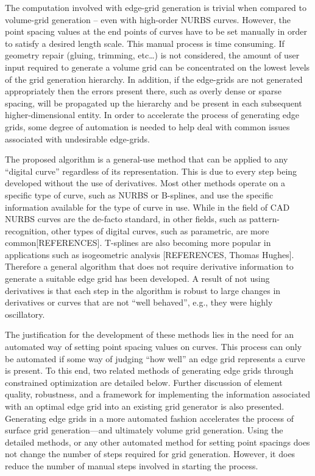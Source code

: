 The computation involved with edge-grid generation is trivial when 
compared to volume-grid generation -- even with high-order NURBS curves. 
However, the point spacing values at the end points of curves have to be set manually in order to satisfy a desired length scale. This manual process is time consuming. If geometry repair (gluing, trimming, etc…) is not considered, the amount of user input required to generate a volume grid can be concentrated on the lowest levels of the grid generation hierarchy. In addition, if the edge-grids are not generated appropriately then the errors present there, such as overly dense or sparse spacing, will be propagated up the hierarchy and be present in each subsequent higher-dimensional entity. In order to accelerate the process of generating edge grids, some degree of automation is needed to help deal with common issues associated with undesirable edge-grids.

The proposed algorithm is a general-use method that can be applied to any 
``digital curve'' regardless of its representation. This is due to every 
step being developed without the use of derivatives. Most other methods 
operate on a specific type of curve, such as NURBS or B-splines, and use 
the specific information available for the type of curve in use. While in 
the field of CAD NURBS curves are the de-facto standard, in other fields, 
such as pattern-recognition, other types of digital curves, such as 
parametric, are more common[REFERENCES]. T-splines are also becoming more 
popular in applications such as isogeometric analysis [REFERENCES, Thomas 
Hughes]. Therefore a general algorithm that does not require derivative 
information to generate a suitable edge grid has been developed. A result 
of not using derivatives is that each step in the algorithm is robust to 
large changes in derivatives or curves that are not ``well behaved'', 
e.g., they were highly oscillatory.

The justification for the development of these methods lies in the need for an automated way of setting point spacing values on curves. This process can only be automated if some way of judging ``how well'' an edge grid represents a curve is present. To this end, two related methods of generating edge grids through constrained optimization are detailed below. Further discussion of element quality, robustness, and a framework for implementing the information associated with an optimal edge grid into an existing grid generator is also presented. Generating edge grids in a more automated fashion accelerates the process of surface grid generation---and ultimately volume grid generation. Using the detailed methods, or any other automated method for setting point spacings does not change the number of steps required for grid generation. However, it does reduce the number of manual steps involved in starting the process.


